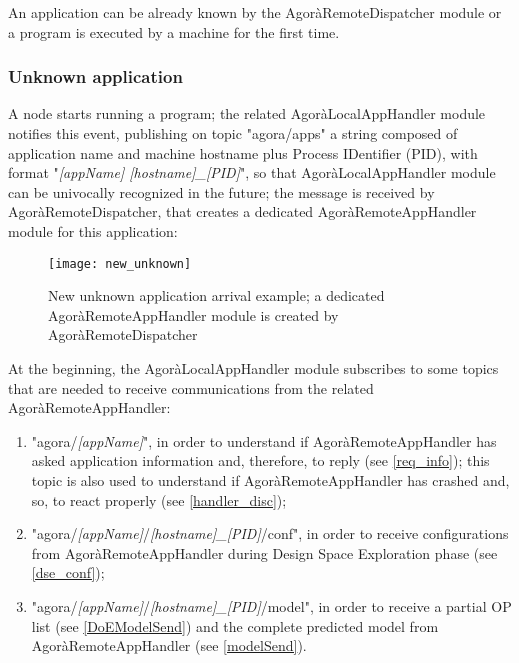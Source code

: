 An application can be already known by the Agorà\-Remote\-Dis\-patch\-er module or a program is executed by a machine for the first time.

\subsubsection{Unknown application}

A node starts running a program; the related AgoràLocalAppHandler module notifies this event, publishing on topic "agora\slash{}apps" a string composed of application name and machine hostname plus Process IDentifier (PID), with format "\textit{[appName] [hostname]\_[PID]}", so that AgoràLocalAppHandler module can be univocally recognized in the future; the message is received by Agorà\-Remote\-Dispatcher, that creates a dedicated AgoràRemoteAppHandler module for this application:

\begin{figure}[H]

    \centering
    \texttt{[image: new\_unknown]}
    \caption[New unknown application arrival example]{New unknown application arrival example; a dedicated AgoràRemoteAppHandler module is created by AgoràRemoteDispatcher}
    
\end{figure}

At the beginning, the AgoràLocalAppHandler module subscribes to some topics that are needed to receive communications from the related AgoràRemoteAppHandler:

\begin{enumerate}

    \item "agora/\textit{[appName]}", in order to understand if AgoràRemoteAppHandler has asked application information and, therefore, to reply (see \ref{req_info}); this topic is also used to understand if Agorà\-Remote\-App\-Handler has crashed and, so, to react properly (see \ref{handler_disc});
    
    \item "agora/\textit{[appName]}/\textit{[hostname]\_[PID]}/conf", in order to receive configurations from AgoràRemoteAppHandler during Design Space Exploration phase (see \ref{dse_conf});
    
    \item "agora/\textit{[appName]}/\textit{[hostname]\_[PID]}/model", in order to receive a partial OP list (see \ref{DoEModelSend}) and the complete predicted model from AgoràRemoteAppHandler (see \ref{modelSend}).

\end{enumerate}

